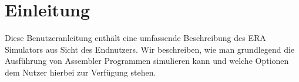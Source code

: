 
\section{Einleitung}

Diese Benutzeranleitung enthält eine umfassende Beschreibung des ERA Simulators aus Sicht des Endnutzers. Wir beschreiben, wie man grundlegend die Ausführung von Assembler Programmen simulieren kann und welche Optionen dem Nutzer hierbei zur Verfügung stehen.
